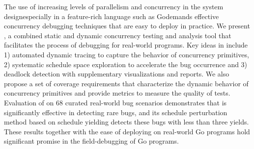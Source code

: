 The use of increasing levels of parallelism and concurrency in the system
design\textemdash especially in a feature-rich language such as Go\textemdash demands
effective concurrency debugging techniques that are easy to deploy in practice.
%
We present \goat, a combined static and dynamic concurrency testing
and analysis tool that facilitates the process of debugging for real-world programs.
%
Key ideas in \goat include
1) automated dynamic tracing to capture the behavior of concurrency primitives,
2) systematic schedule space exploration to accelerate the bug occurrence
and 3) deadlock detection with supplementary visualizations and reports.
We also propose a set of coverage requirements that characterize the dynamic behavior of concurrency primitives and provide metrics to measure the quality of tests.
%
Evaluation of \goat on 68 curated real-world bug scenarios
demonstrates that \goat is significantly effective in detecting
rare bugs, and its schedule perturbation method based on schedule
yielding detects these bugs with less than three yields.
%
These results together with the ease of deploying \goat on real-world
Go programs hold significant promise in the field-debugging of Go programs.
